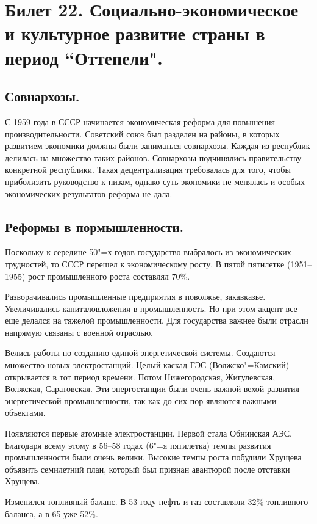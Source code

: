 \section{Билет 22. Социально-экономическое и культурное развитие страны в период “Оттепели".}

\subsection{Совнархозы.}

С 1959 года в СССР начинается экономическая реформа для повышения производительности. Советский союз был разделен на районы, в которых развитием экономики должны были заниматься совнархозы. Каждая из республик делилась на множество таких районов. Совнархозы подчинялись правительству конкретной республики. Такая децентрализация требовалась для того, чтобы приболизить руководство к низам, однако суть экономики не менялась и особых экономических результатов реформа не дала.

\subsection{Реформы в пормышленности.}

Поскольку к середине 50"=х годов государство выбралось из экономических трудностей, то СССР перешел к экономическому росту. В пятой пятилетке (1951--1955) рост промышленного роста составлял 70\%. 

Разворачивались промышленные предприятия в поволжье, закавказье. Увеличивались капиталовложения в промышленность. Но при этом акцент все еще делался на тяжелой промышленности. Для государства важнее были отрасли напрямую связаны с военной отраслью. 

Велись работы по созданию единой энергетической системы. Создаются множество новых электростанций. Целый каскад ГЭС (Волжско"=Камский) открывается в тот период времени. Потом Нижегородская, Жигулевская, Волжская, Саратовская. Эти энергостанции были очень важной вехой развития энергетической промышленности, так как до сих пор являются важными объектами. 

Появляются первые атомные электростанции. Первой стала Обнинская АЭС. Благодаря всему этому в 56--58 годах (6"=я пятилетка) темпы развития промышленности были очень велики. Высокие темпы роста побудили Хрущева объявить семилетний план, который был признан авантюрой после отставки Хрущева.

Изменился топливный баланс. В 53 году нефть и газ составляли 32\% топливного баланса, а в 65 уже 52\%. 

